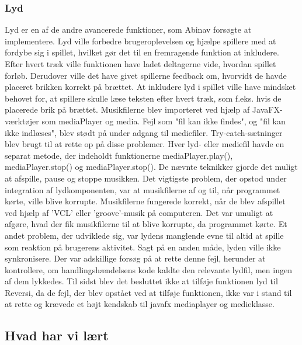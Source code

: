 \subsubsection{Lyd}\label{lyd}
Lyd er en af de andre avancerede funktioner, som Abinav forsøgte at implementere. Lyd ville forbedre brugeroplevelsen og hjælpe spillere med at fordybe sig i spillet, hvilket gør det til en fremragende funktion at inkludere. Efter hvert træk ville funktionen have ladet deltagerne vide, hvordan spillet forløb. Derudover ville det have givet spillerne feedback om, hvorvidt de havde placeret brikken korrekt på brættet. At inkludere lyd i spillet ville have mindsket behovet for, at spillere skulle læse teksten efter hvert træk, som f.eks. hvis de placerede brik på brættet.
Musikfilerne blev importeret ved hjælp af JavaFX-værktøjer som mediaPlayer og media. Fejl som "fil kan ikke findes", og "fil kan ikke indlæses", blev stødt på under adgang til mediefiler. Try-catch-sætninger blev brugt til at rette op på disse problemer. Hver lyd- eller mediefil havde en separat metode, der indeholdt funktionerne mediaPlayer.play(), mediaPlayer.stop() og mediaPlayer.stop(). De nævnte teknikker gjorde det muligt at afspille, pause og stoppe musikken. Det vigtigste problem, der opstod under integration af lydkomponenten, var at musikfilerne af og til, når programmet kørte, ville blive korrupte. Musikfilerne fungerede korrekt, når de blev afspillet ved hjælp af 'VCL' eller 'groove'-musik på computeren. Det var umuligt at afgøre, hvad der fik musikfilerne til at blive korrupte, da programmet kørte. Et andet problem, der udviklede sig, var lydens manglende evne til altid at spille som reaktion på brugerens aktivitet. Sagt på en anden måde, lyden ville ikke synkronisere. Der var adskillige forsøg på at rette denne fejl, herunder at kontrollere, om handlingshændelsens kode kaldte den relevante lydfil, men ingen af dem lykkedes. Til sidst blev det besluttet ikke at tilføje funktionen lyd til Reversi, da de fejl, der blev opstået ved at tilføje funktionen, ikke var i stand til at rette og krævede et højt kendskab til javafx mediaplayer og medieklasse.


\subsection{Hvad har vi lært}
